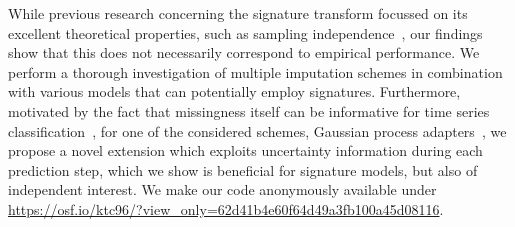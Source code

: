 \documentclass{article}
\begin{document}
While previous research concerning the signature transform
focussed on its excellent theoretical properties, such as sampling
independence~\citep[Proposition A.7]{kidger2019deep}, our findings show
that this does not
necessarily correspond to empirical performance.
%
We perform a thorough investigation of multiple imputation schemes in combination with various models that can potentially employ signatures.
Furthermore, motivated by the fact that missingness itself can be
informative for time series classification~\citep{rubin1976inference}, for one of the considered schemes, Gaussian process adapters~\citep{li2016scalable}, we propose a novel extension which exploits uncertainty information during each prediction step, which we show is beneficial for signature models, but also of independent interest.
%
%
%
We make our code anonymously available under \url{https://osf.io/ktc96/?view_only=62d41b4e60f64d49a3fb100a45d08116}.


\end{document}
